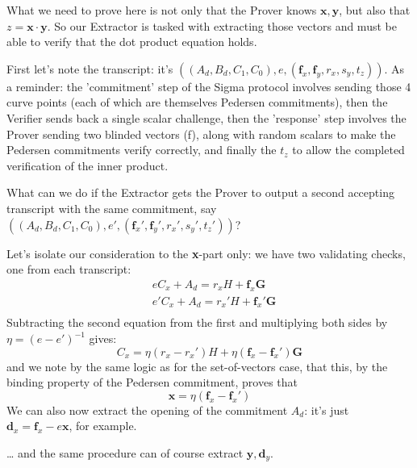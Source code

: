 \documentclass[10pt,a4paper]{article}
\begin{document}
What we need to prove here is not only that the Prover knows $\mathbf{x}, \mathbf{y}$, but also
that $z = \mathbf{x}\cdot \mathbf{y}$. So our Extractor is tasked with extracting those vectors and must
be able to verify that the dot product equation holds.

First let's note the transcript: it's $\left((A_d, B_d, C_1, C_0), e, (\textbf{f}_x, \textbf{f}_y, r_x, s_y, t_z)\right)$. As a reminder: the 'commitment'
step of the Sigma protocol involves sending those 4 curve points (each
of which are themselves Pedersen commitments), then the Verifier sends
back a single scalar challenge, then the 'response' step involves the
Prover sending two blinded vectors (f), along with random scalars to
make the Pedersen commitments verify correctly, and finally the $t_z$ to allow
the completed verification of the inner product.

What can we do if the Extractor gets the Prover to output a second
accepting transcript with the same commitment, say $\left((A_d, B_d, C_1, C_0), e', (\textbf{f}_x', \textbf{f}_y', r_x', s_y', t_z')\right)$?

Let's isolate our consideration to the \textbf{x}-part only: we have two
validating checks, one from each transcript:
\begin{align*}
& eC_x + A_d = r_xH + \mathbf{f}_x\mathbf{G} \\
& e' C_x + A_d = r_x' H + \mathbf{f}_x' \mathbf{G} \\
\end{align*}
Subtracting the second equation from the first and multiplying both
sides by $\eta = (e-e')^{-1}$ gives:
\[C_x = \eta (r_x - r_x') H + \eta (\mathbf{f}_x - \mathbf{f}_x' ) \mathbf{G}\]
and we note by the same logic as for the set-of-vectors case, that this,
by the binding property of the Pedersen commitment, proves that
\[\mathbf{x} = \eta (\mathbf{f}_x - \mathbf{f}_x')\]
We can also now extract the opening of the commitment $A_d$: it's just $\mathbf{d}_x = \mathbf{f}_x - e\mathbf{x}$, for
example.

\ldots{} and the same procedure can of course extract $\mathbf{y}, \mathbf{d}_y$.
\end{document}
